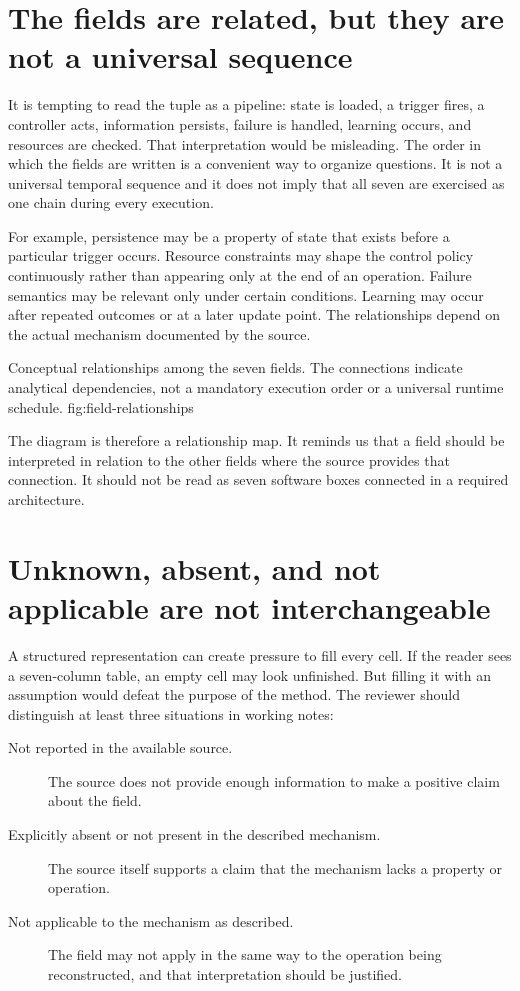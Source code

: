 \section{The fields are related, but they are not a universal sequence}
\label{sec:field-relationships}

It is tempting to read the tuple as a pipeline: state is loaded, a trigger fires, a controller acts, information persists, failure is handled, learning occurs, and resources are checked. That interpretation would be misleading. The order in which the fields are written is a convenient way to organize questions. It is not a universal temporal sequence and it does not imply that all seven are exercised as one chain during every execution.

For example, persistence may be a property of state that exists before a particular trigger occurs. Resource constraints may shape the control policy continuously rather than appearing only at the end of an operation. Failure semantics may be relevant only under certain conditions. Learning may occur after repeated outcomes or at a later update point. The relationships depend on the actual mechanism documented by the source.

  {Conceptual relationships among the seven fields. The connections indicate analytical dependencies, not a mandatory execution order or a universal runtime schedule.}
  {fig:field-relationships}

The diagram is therefore a relationship map. It reminds us that a field should be interpreted in relation to the other fields where the source provides that connection. It should not be read as seven software boxes connected in a required architecture.

\section{Unknown, absent, and not applicable are not interchangeable}
\label{sec:unknown-fields}

A structured representation can create pressure to fill every cell. If the reader sees a seven-column table, an empty cell may look unfinished. But filling it with an assumption would defeat the purpose of the method. The reviewer should distinguish at least three situations in working notes:

\begin{description}
  \item[Not reported in the available source.] The source does not provide enough information to make a positive claim about the field.
  \item[Explicitly absent or not present in the described mechanism.] The source itself supports a claim that the mechanism lacks a property or operation.
  \item[Not applicable to the mechanism as described.] The field may not apply in the same way to the operation being reconstructed, and that interpretation should be justified.
\end{description}

